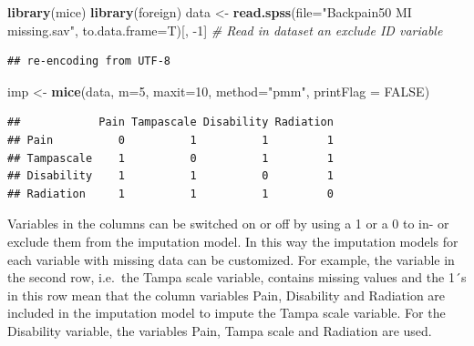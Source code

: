\documentclass[
]{book}
\newenvironment{Shaded}{\begin{snugshade}}{\end{snugshade}}
\newcommand{\CommentTok}[1]{\textcolor[rgb]{0.56,0.35,0.01}{\textit{#1}}}
\newcommand{\DataTypeTok}[1]{\textcolor[rgb]{0.13,0.29,0.53}{#1}}
\newcommand{\DecValTok}[1]{\textcolor[rgb]{0.00,0.00,0.81}{#1}}
\newcommand{\KeywordTok}[1]{\textcolor[rgb]{0.13,0.29,0.53}{\textbf{#1}}}
\newcommand{\NormalTok}[1]{#1}
\newcommand{\OperatorTok}[1]{\textcolor[rgb]{0.81,0.36,0.00}{\textbf{#1}}}
\newcommand{\OtherTok}[1]{\textcolor[rgb]{0.56,0.35,0.01}{#1}}
\newcommand{\StringTok}[1]{\textcolor[rgb]{0.31,0.60,0.02}{#1}}
\begin{document}
\begin{Shaded}
\begin{Highlighting}[]
\KeywordTok{library}\NormalTok{(mice)}
\KeywordTok{library}\NormalTok{(foreign)}
\NormalTok{data <-}\StringTok{ }\KeywordTok{read.spss}\NormalTok{(}\DataTypeTok{file=}\StringTok{"Backpain50 MI missing.sav"}\NormalTok{, }\DataTypeTok{to.data.frame=}\NormalTok{T)[, }\DecValTok{-1}\NormalTok{] }\CommentTok{# Read in dataset an exclude ID variable}
\end{Highlighting}
\end{Shaded}

\begin{verbatim}
## re-encoding from UTF-8
\end{verbatim}

\begin{Shaded}
\begin{Highlighting}[]
\NormalTok{imp <-}\StringTok{ }\KeywordTok{mice}\NormalTok{(data, }\DataTypeTok{m=}\DecValTok{5}\NormalTok{, }\DataTypeTok{maxit=}\DecValTok{10}\NormalTok{, }\DataTypeTok{method=}\StringTok{"pmm"}\NormalTok{, }\DataTypeTok{printFlag =} \OtherTok{FALSE}\NormalTok{)}
\end{Highlighting}
\end{Shaded}

\begin{Shaded}
\end{Shaded}

\begin{verbatim}
##            Pain Tampascale Disability Radiation
## Pain          0          1          1         1
## Tampascale    1          0          1         1
## Disability    1          1          0         1
## Radiation     1          1          1         0
\end{verbatim}

Variables in the columns can be switched on or off by using a 1 or a 0
to in- or exclude them from the imputation model. In this way the
imputation models for each variable with missing data can be customized.
For example, the variable in the second row, i.e.~the Tampa scale
variable, contains missing values and the 1´s in this row mean that the
column variables Pain, Disability and Radiation are included in the
imputation model to impute the Tampa scale variable. For the Disability
variable, the variables Pain, Tampa scale and Radiation are used.
\end{document}
